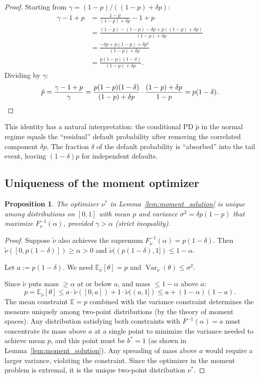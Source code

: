 \documentclass[11pt]{article}
\newtheorem{proposition}[theorem]{Proposition}
\theoremstyle{definition}
\newcommand{\E}{\mathbb{E}}
\newcommand{\Var}{\operatorname{Var}}
\newcommand{\1}{\mathbf{1}}
\begin{document}
\begin{proof}
Starting from $\gamma = (1-p)/((1-p) + \delta p)$:
\begin{align*}
  \gamma - 1 + p &= \frac{1-p}{(1-p) + \delta p} - 1 + p \\
  &= \frac{(1-p) - (1-p) - \delta p + p((1-p) + \delta p)}{(1-p) + \delta p} \\
  &= \frac{-\delta p + p(1-p) + \delta p^2}{(1-p) + \delta p} \\
  &= \frac{p(1-p)(1-\delta)}{(1-p) + \delta p}.
\end{align*}
Dividing by $\gamma$:
\[
  \tilde{p} = \frac{\gamma - 1 + p}{\gamma} = \frac{p(1-p)(1-\delta)}{(1-p) + \delta p} \cdot \frac{(1-p) + \delta p}{1-p} = p(1-\delta). \qedhere
\]
\end{proof}

This identity has a natural interpretation: the conditional PD $\tilde{p}$ in the normal regime equals the ``residual'' default probability after removing the correlated component $\delta p$. The fraction $\delta$ of the default probability is ``absorbed'' into the tail event, leaving $(1-\delta)p$ for independent defaults.

\subsection{Uniqueness of the moment optimizer}\label{app:uniqueness}

\begin{proposition}\label{prop:unique_opt}
The optimizer $\nu^*$ in Lemma~\ref{lem:moment_solution} is unique among distributions on $[0,1]$ with mean $p$ and variance $\sigma^2 = \delta p(1-p)$ that maximize $F_\nu^{-1}(\alpha)$, provided $\gamma > \alpha$ (strict inequality).
\end{proposition}

\begin{proof}
Suppose $\tilde{\nu}$ also achieves the supremum $F_{\tilde{\nu}}^{-1}(\alpha) = p(1-\delta)$. Then $\tilde{\nu}([0, p(1-\delta)]) \geq \alpha > 0$ and $\tilde{\nu}((p(1-\delta), 1]) \leq 1 - \alpha$.

Let $a := p(1-\delta)$. We need $\E_{\tilde{\nu}}[\theta] = p$ and $\Var_{\tilde{\nu}}(\theta) \leq \sigma^2$.

Since $\tilde{\nu}$ puts mass $\geq \alpha$ at or below $a$, and mass $\leq 1-\alpha$ above $a$:
\[
  p = \E_{\tilde{\nu}}[\theta] \leq a \cdot \tilde{\nu}([0,a]) + 1 \cdot \tilde{\nu}((a,1]) \leq a + (1-\alpha)(1-a).
\]
The mean constraint $\E = p$ combined with the variance constraint determines the measure uniquely among two-point distributions (by the theory of moment spaces). Any distribution satisfying both constraints with $F^{-1}(\alpha) = a$ must concentrate its mass above $a$ at a single point to minimize the variance needed to achieve mean $p$, and this point must be $b^* = 1$ (as shown in Lemma~\ref{lem:moment_solution}). Any spreading of mass above $a$ would require a larger variance, violating the constraint. Since the optimizer in the moment problem is extremal, it is the unique two-point distribution $\nu^*$.
\end{proof}
\end{document}
